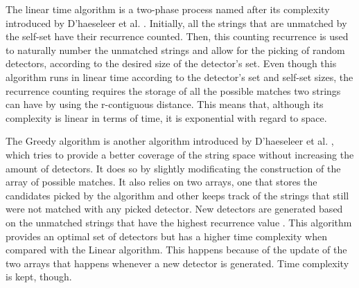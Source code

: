 The linear time algorithm is a two-phase process named after its complexity introduced by D’haeseleer et al. \cite{NSADetGen1996}. Initially, all the strings that are unmatched by the self-set have their recurrence counted. Then, this counting recurrence is used to naturally number the unmatched strings and allow for the picking of random detectors, according to the desired size of the detector's set. Even though this algorithm runs in linear time according to the detector's set and self-set sizes, the recurrence counting requires the storage of all the possible matches two strings can have by using the r-contiguous distance. This means that, although its complexity is linear in terms of time, it is exponential with regard to space. 

The Greedy algorithm is another algorithm introduced by D’haeseleer et al. \cite{NSADetGen1996}, which tries to provide a better coverage of the string space without increasing the amount of detectors. It does so by slightly modificating the construction of the array of possible matches. It also relies on two arrays, one that stores the candidates picked by the algorithm and other keeps track of the strings that still were not matched with any picked detector. New detectors are generated based on the unmatched strings that have the highest recurrence value \cite{ICBook2009}. This algorithm provides an optimal set of detectors but has a higher time complexity when compared with the Linear algorithm. This happens because of the update of the two arrays that happens whenever a new detector is generated. Time complexity is kept, though.








